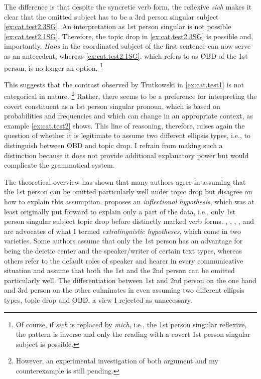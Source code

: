 The difference is that despite the syncretic  verb form, the reflexive \textit{sich}  makes it clear that the omitted subject has to be a 3rd person singular subject \ref{ex:cat.test2.3SG}.
An interpretation as 1st person singular is not possible \ref{ex:cat.test2.1SG}.
Therefore, the topic drop in \ref{ex:cat.test2.3SG} is possible and, importantly, \textit{Hans} in the coordinated subject of the first sentence can now serve as an antecedent,  whereas \ref{ex:cat.test2.1SG}, which \citet{trutkowski2016} refers to as OBD of the 1st person, is no longer an option.%
\footnote{Of course, if \textit{sich} is replaced by \textit{mich}, i.e., the 1st person singular reflexive,  the pattern is inverse and only the reading with a covert 1st person singular subject is possible.}
%

This suggests that the contrast observed by Trutkowski in \ref{ex:cat.test1} is not categorical in nature.%
\footnote{However, an experimental investigation of both  argument and my counterexample is still pending.
}
Rather, there seems to be a preference for interpreting the covert constituent as a 1st person singular pronoun, which is based on probabilities and frequencies and which can change in an appropriate context, as example \ref{ex:cat.test2} shows.
This line of reasoning, therefore, raises again the question of whether it is legitimate to assume two different ellipsis types, i.e., to distinguish between OBD and topic drop.
I refrain from making such a distinction because it does not provide additional explanatory power but would complicate the grammatical system.

The theoretical overview has shown that many authors agree in assuming that the 1st person can be omitted particularly well under topic drop but disagree on how to explain this assumption.
\citet{auer1993} proposes an \textit{inflectional hypothesis}, which was at least originally put forward to explain only a part of the data, i.e., only 1st person singular subject topic drop before distinctly marked verb forms.
\citet{zifonun.etal1997}, \citet{volodina2011}, \citet{volodina.onea2012}, \citet{imo2013, imo2014}, and \citet{schalowski2015} are advocates of what I termed \textit{extralinguistic hypotheses}, which come in two varieties.
Some authors assume that only the 1st person has an advantage for being the deictic center and the speaker/writer of certain text types, whereas others refer to the default roles of speaker and hearer in every communicative situation and assume that both the 1st and the 2nd person can be omitted particularly well.
The differentiation between 1st and 2nd person on the one hand and 3rd person on the other culminates in \citet{trutkowski2016} even assuming two different ellipsis types, topic drop and OBD, a view I rejected as unnecessary.


